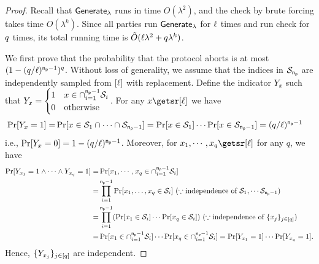 \begin{proof}

Recall that ${\mathsf{Generate}}_\lambda$ runs in time $O(\lambda^2)$, and the check by brute forcing takes time $O(\lambda^k)$. Since all parties run ${\mathsf{Generate}}_\lambda$ for $\ell$ times and run check for $q$ times, its total running time is $\tilde{O}(\ell \lambda^2 + q \lambda^k)$.

We first prove that the probability that the protocol aborts is at most $(1- (q/\ell)^{\mathsf{n_p}-1})^{q}$.
Without loss of generality, we assume that the indices in $\mathcal{S}_{\mathsf{n_p}}$ are independently sampled from $[\ell]$ with replacement. Define the indicator $Y_x$ such that
$Y_x=\begin{cases} 1 & x\in\cap_{i=1}^{\mathsf{n_p}-1}\mathcal{S}_i\\
0 & \text{otherwise}
\end{cases}$. For any $x\getsr [\listlength]$ we have
\[\begin{split}
\Pr[Y_x=1]=&\Pr[ x\in\mathcal{S}_1\cap\cdots\cap\mathcal{S}_{\mathsf{n_p}-1}]
=\Pr[ x\in\mathcal{S}_1]\cdots\Pr[ x\in\mathcal{S}_{\mathsf{n_p}-1}]
=({q}/{\ell})^{\mathsf{n_p}-1}
\end{split}\]
i.e.,
$ \Pr[Y_x=0]=1- ({q}/{\ell})^{\mathsf{n_p}-1}$.
Moreover, for $x_1,\cdots,x_\solutionlength\getsr[\ell]$ for any $q$, we have
\[\begin{split}
\Pr[Y_{x_1}=1\land \cdots \land Y_{x_q}=1]
=&\Pr[x_1,\cdots,x_{q}\in \cap_{i=1}^{\mathsf{n_p}-1}\mathcal{S}_i]\\
=&\prod_{i=1}^{\mathsf{n_p}-1}\Pr[x_1, \dots, x_{q}\in \mathcal{S}_i]\ ( \because \mbox{independence of $\mathcal{S}_1,\cdots \mathcal{S}_{\mathsf{n_p}-1}$})\\
=&\prod_{i=1}^{\mathsf{n_p}-1}(\Pr[x_1\in\mathcal{S}_i]\cdots\Pr[x_{q}\in \mathcal{S}_i]) \ ( \because \mbox{independence of $\{x_j\}_{j \in [q]}$})\\
=&\Pr[x_1\in\cap_{i=1}^{\mathsf{n_p}-1}\mathcal{S}_i]\cdots\Pr[x_{q}\in \cap_{i=1}^{\mathsf{n_p}-1}\mathcal{S}_i]
=\Pr[Y_{x_1}=1]\cdots \Pr[Y_{x_{q}}=1].
\end{split}\]
Hence, $\{Y_{x_j}\}_{j \in [q]}$ are independent.


\end{proof}
